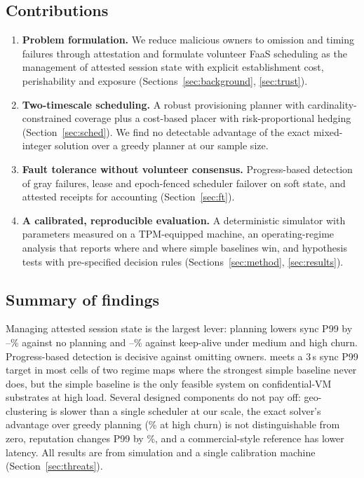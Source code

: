\subsection{Contributions}
\begin{enumerate}
\item \textbf{Problem formulation.} We reduce malicious owners to omission and timing failures through attestation and
formulate volunteer FaaS scheduling as the management of attested session state with explicit establishment cost,
perishability and exposure (Sections~\ref{sec:background}, \ref{sec:trust}).
\item \textbf{Two-timescale scheduling.} A robust provisioning planner with cardinality-constrained coverage plus a
cost-based placer with risk-proportional hedging (Section~\ref{sec:sched}). We find no detectable advantage of the exact
mixed-integer solution over a greedy planner at our sample size.
\item \textbf{Fault tolerance without volunteer consensus.} Progress-based detection of gray failures, lease and epoch-fenced
scheduler failover on soft state, and attested receipts for accounting (Section~\ref{sec:ft}).
\item \textbf{A calibrated, reproducible evaluation.} A deterministic simulator with parameters measured on a TPM-equipped
machine, an operating-regime analysis that reports where \voss{} and where simple baselines win, and hypothesis tests with
pre-specified decision rules (Sections~\ref{sec:method}, \ref{sec:results}).
\end{enumerate}

\subsection{Summary of findings}
Managing attested session state is the largest lever: planning lowers sync P99 by \GreedyNoneMed--\GreedyNoneHigh\% against no
planning and \GreedyKeepMed--\GreedyKeepHigh\% against keep-alive under medium and high churn. Progress-based detection is
decisive against omitting owners. \voss{} meets a 3\,s sync P99 target in most cells of two regime maps where the strongest
simple baseline never does, but the simple baseline is the only feasible system on confidential-VM substrates at high load.
Several designed components do not pay off: geo-clustering is slower than a single scheduler at our scale, the exact solver's advantage over greedy planning (\MilpGreedyHigh\% at high churn) is not distinguishable from zero, reputation changes P99 by \RepPNinetyninePct\%, and a commercial-style
reference has lower latency. All results are from simulation and a single calibration machine (Section~\ref{sec:threats}).
